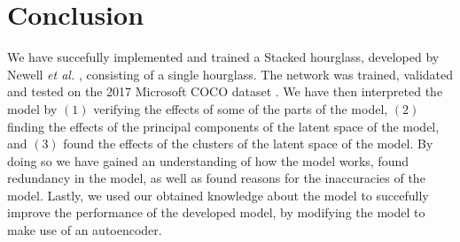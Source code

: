 \documentclass[./main.tex]{subfiles}
\begin{document}
\section{Conclusion}\label{sec:conclusion} 
We have succefully implemented and trained a Stacked hourglass, developed by Newell \textit{et al.} \cite{Newell}, consisting of a single hourglass. The network was trained, validated and tested on the 2017 Microsoft COCO dataset \cite{COCO_article}. We have then interpreted the model by $(1)$ verifying the effects of some of the parts of the model, $(2)$ finding the effects of the principal components of the latent space of the model, and $(3)$ found the effects of the clusters of the latent space of the model. By doing so we have gained an understanding of how the model works, found redundancy in the model, as well as found reasons for the inaccuracies of the model. Lastly, we used our obtained knowledge about the model to succefully improve the performance of the developed model, by modifying the model to make use of an autoencoder.
\end{document}
